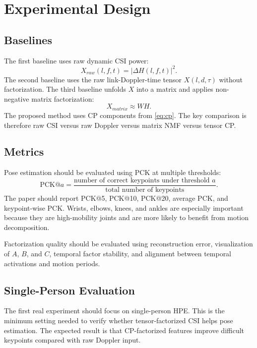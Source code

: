 \documentclass[10pt,journal]{IEEEtran}
\begin{document}
\section{Experimental Design}

\subsection{Baselines}

The first baseline uses raw dynamic CSI power:
\begin{equation}
    X_{raw}(l,f,t)=|\Delta H(l,f,t)|^2.
\end{equation}
The second baseline uses the raw link-Doppler-time tensor $X(l,d,\tau)$ without factorization. The third baseline unfolds $X$ into a matrix and applies non-negative matrix factorization:
\begin{equation}
    X_{matrix}\approx WH.
\end{equation}
The proposed method uses CP components from \eqref{eq:cp}. The key comparison is therefore raw CSI versus raw Doppler versus matrix NMF versus tensor CP.

\subsection{Metrics}

Pose estimation should be evaluated using PCK at multiple thresholds:
\begin{equation}
    \mathrm{PCK}@a
    =
    \frac{\text{number of correct keypoints under threshold }a}
    {\text{total number of keypoints}}.
\end{equation}
The paper should report PCK@5, PCK@10, PCK@20, average PCK, and keypoint-wise PCK. Wrists, elbows, knees, and ankles are especially important because they are high-mobility joints and are more likely to benefit from motion decomposition.

Factorization quality should be evaluated using reconstruction error, visualization of $A$, $B$, and $C$, temporal factor stability, and alignment between temporal activations and motion periods.

\subsection{Single-Person Evaluation}

The first real experiment should focus on single-person HPE. This is the minimum setting needed to verify whether tensor-factorized CSI helps pose estimation. The expected result is that CP-factorized features improve difficult keypoints compared with raw Doppler input.
\end{document}
